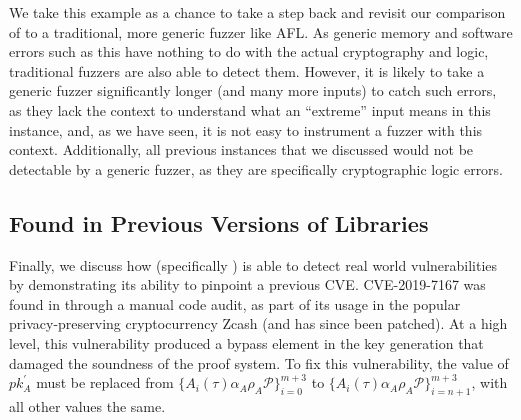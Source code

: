 We take this example as a chance to take a step back and revisit our comparison of \SnarkFuzzer to a traditional, more generic fuzzer like AFL.  As generic memory and software errors such as this have nothing to do with the actual cryptography and \zksnark logic, traditional fuzzers are also able to detect them.  However, it is likely to take a generic fuzzer significantly longer (and many more inputs) to catch such errors, as they lack the context to understand what an ``extreme'' input means in this instance, and, as we have seen, it is not easy to instrument a fuzzer with this context.  Additionally, all previous instances that we discussed would not be detectable by a generic fuzzer, as they are specifically cryptographic logic errors.




\subsection{Found in Previous Versions of Libraries}
 Finally, we discuss how \snarkprobe (specifically \SnarkFuzzer) is able to detect real world vulnerabilities by demonstrating its ability to pinpoint a previous CVE.
CVE-2019-7167 \cite{gabizon2019auroralight} was found in \libsnark through a manual code audit, as part of its usage in the popular privacy-preserving cryptocurrency Zcash \cite{zcash} (and has since been patched).
At a high level, this vulnerability produced a bypass element in the key generation that damaged the soundness of the \zksnark proof system. To fix this vulnerability, the value of $pk_{A}^{'}$ must be replaced from $\{A_{i}(\tau)\alpha_{A}\rho_{A}\mathcal{P}\}_{i=0}^{m+3}$ to $\{A_{i}(\tau)\alpha_{A}\rho_{A}\mathcal{P}\}_{i=n+1}^{m+3}$, with all other values the same.

